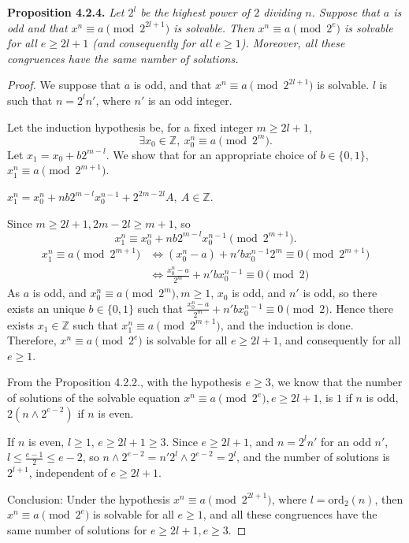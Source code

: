 \documentclass[11pt,a4paper]{article}
\newcommand{\Z}{\mathbb{Z}}
\begin{document}
\bigskip
{\bf Proposition 4.2.4.} 
{\it Let $2^l$ be the highest power of $2$ dividing $n$. Suppose that $a$ is odd and that $x^n \equiv a \pmod {2^{2l+1}}$ is solvable. Then $x^n \equiv a \pmod{2^e}$ is solvable for all $e\geq 2l+1$ (and consequently for all $e\geq 1$). Moreover, all these congruences have the same number of solutions.
}
\begin{proof}
We suppose that $a$ is odd, and that $x^n\equiv a \pmod {2^{2l+1}}$ is solvable. $l$ is such that $n = 2^l n'$, where $n'$ is an odd integer.

Let the induction hypothesis  be, for a fixed integer $m\geq 2l+1$,
$$\exists x_0 \in \Z,\  x_0^n\equiv a \pmod{2^m}.$$
Let $x_1 = x_0 + b 2^{m-l}$. We show that for an appropriate choice of $b\in \{0,1\}$,  $x_1^n \equiv a \pmod {2^{m+1}}$.

$x_1^n = x_0^n + nb2^{m-l}x_0^{n-1} + 2^{2m-2l} A,\  A \in \Z$.

Since $m\geq 2l+1, 2m-2l \geq m+1$, so
$$x_1^n \equiv x_0^n + nb2^{m-l}x_0^{n-1} \pmod {2^{m+1}}.$$
\begin{align*}
x_1^n \equiv a \pmod {2^{m+1}} &\iff (x_0^n -a) + n' b x_0^{n-1} 2^m \equiv 0 \pmod {2^{m+1}}\\
&\iff\frac{x_0^n - a}{2^m} + n' b x_0^{n-1} \equiv 0 \pmod 2
\end{align*}
As $a$ is odd, and  $x_0^n \equiv a \pmod {2^m}, m\geq 1$, $x_0$ is odd, and $n'$ is odd, so there exists an unique $b \in \{0,1\}$ such that $\frac{x_0^n - a}{2^m} + n' b x_0^{n-1} \equiv 0 \pmod 2$. Hence there exists $x_1 \in \Z$ such that $x_1^n \equiv a \pmod {2^{m+1}}$, and the induction is done. Therefore, $x^n \equiv a \pmod{2^e}$ is solvable for all $e\geq 2l+1$, and consequently for all $e\geq 1$. 

\bigskip

From the Proposition 4.2.2., with the hypothesis $e\geq 3$,  we know that the number of solutions of the solvable equation $x^n \equiv a \pmod {2^e}, e\geq 2l+1$,  is $1$ if $n$ is odd, $2(n\wedge 2^{e-2})$ if $n$ is even.

If $n$ is even, $l\geq 1$, $e \geq 2l+1 \geq 3$.
Since $e\geq 2l+1$, and $n = 2^l n'$ for an odd $n'$, $l\leq \frac{e-1}{2} \leq e-2$, so $n \wedge 2^{e-2} = n'2^{l} \wedge 2^{e-2}= 2^l$, and the number of solutions is $2^{l+1}$, independent of $e\geq 2l+1$.

Conclusion: Under the hypothesis $x^n \equiv a \pmod {2^{2l+1}}$, where $l = \mathrm{ord}_2(n)$, then $x^n \equiv a \pmod {2^e}$ is solvable for all $e\geq 1$, and all these congruences have the same number of solutions for $e\geq 2l+1, e\geq 3$.
\end{proof}
\end{document}
